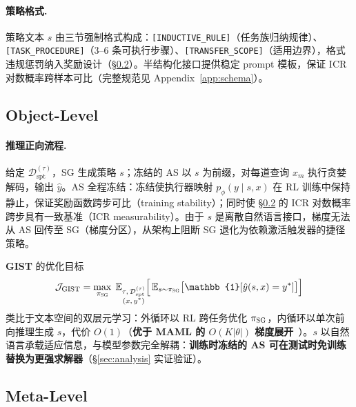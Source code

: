 \documentclass[11pt]{article}
\newcommand{\gist}{\textbf{GIST}}
\newcommand{\sg}{\textnormal{\textsc{SG}}}
\newcommand{\as}{\textnormal{\textsc{AS}}}
\begin{document}
\paragraph{策略格式.}
策略文本 $s$ 由三节强制格式构成：\texttt{[INDUCTIVE\_RULE]}（任务族归纳规律）、\texttt{[TASK\_PROCEDURE]}（3--6 条可执行步骤）、\texttt{[TRANSFER\_SCOPE]}（适用边界），格式违规惩罚纳入奖励设计（\S\ref{sec:training}）。半结构化接口提供稳定 prompt 模板，保证 ICR 对数概率跨样本可比（完整规范见 Appendix~\ref{app:schema}）。

\subsection{Object-Level}
\label{sec:object}

\paragraph{推理正向流程.}
给定 $\mathcal{D}_\text{spt}^{(\tau)}$，\sg{} 生成策略 $s$；冻结的 \as{} 以 $s$ 为前缀，对每道查询 $x_m$ 执行贪婪解码，输出 $\hat{y}$。\as{} 全程冻结：冻结使执行器映射 $p_\phi(y \mid s, x)$ 在 RL 训练中保持静止，保证奖励函数跨步可比（training stability）；同时使 \S\ref{sec:training} 的 ICR 对数概率跨步具有一致基准（ICR measurability）。由于 $s$ 是离散自然语言接口，梯度无法从 \as{} 回传至 \sg{}（梯度分区），从架构上阻断 \sg{} 退化为依赖激活触发器的捷径策略。

\gist{} 的优化目标
\begin{equation}
  \mathcal{J}_{\text{GIST}} =
    \max_{\pi_{\sg{}}}\;
    \mathbb{E}_{\substack{\tau,\,\mathcal{D}_\text{spt}^{(\tau)}\\(x,\,y^*)}}
    \Bigl[\,
    \mathbb{E}_{s \sim \pi_{\sg{}}}
    \bigl[\mathbb{1}[\hat{y}(s,x) = y^*]\bigr]
    \Bigr]
  \label{eq:j_gist}
\end{equation}
类比于文本空间的双层元学习：外循环以 RL 跨任务优化 $\pi_{\sg{}}$，内循环以单次前向推理生成 $s$，代价 $O(1)$（\textbf{优于 MAML 的 $O(K|\theta|)$ 梯度展开}~\citep{finn2017maml}）。$s$ 以自然语言承载适应信息，与模型参数完全解耦：\textbf{训练时冻结的 \as{} 可在测试时免训练替换为更强求解器}（\S\ref{sec:analysis} 实证验证）。

\subsection{Meta-Level}
\label{sec:training}\label{sec:reward}
\end{document}
